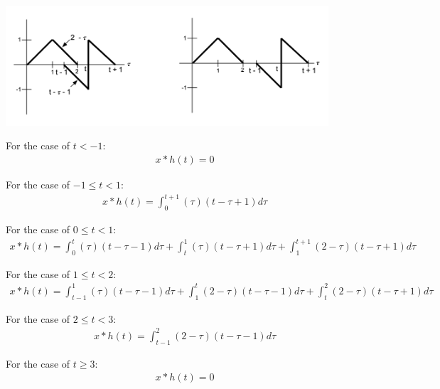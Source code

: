 \documentclass{article}
\begin{document}
\begin{center}
    \includegraphics[width=0.9\textwidth]{41e5.png}
\end{center}

For the case of $t < -1$:
\begin{equation*}
\begin{split}
    x * h(t) = 0
\end{split}
\end{equation*}

For the case of $-1 \leq t < 1$:
\begin{equation*}
\begin{split}
    x * h(t) = \int_{0}^{t + 1} (\tau)(t - \tau + 1)d \tau
\end{split}
\end{equation*}

For the case of $0 \leq t < 1$:
\begin{equation*}
\begin{split}
    x * h(t) = \int_{0}^{t} (\tau)(t - \tau - 1)d \tau + \int_{t}^{1} (\tau)(t - \tau + 1)d \tau + \int_{1}^{t + 1} (2 - \tau)(t - \tau + 1)d \tau
\end{split}
\end{equation*}

For the case of $1 \leq t < 2$:
\begin{equation*}
\begin{split}
    x * h(t) = \int_{t-1}^{1} (\tau)(t - \tau - 1)d \tau + \int_{1}^{t} (2 - \tau)(t - \tau - 1)d \tau + \int_{t}^{2} (2 - \tau)(t - \tau + 1)d \tau
\end{split}
\end{equation*}

For the case of $2 \leq t < 3$:
\begin{equation*}
\begin{split}
    x * h(t) = \int_{t-1}^{2} (2 - \tau)(t - \tau - 1)d \tau
\end{split}
\end{equation*}

For the case of $t \geq 3$:
\begin{equation*}
\begin{split}
    x * h(t) = 0
\end{split}
\end{equation*}
\end{document}
